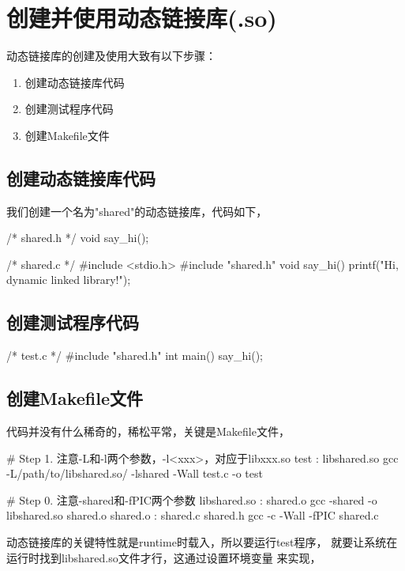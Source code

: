 ﻿\section[Shared library(.so)]{创建并使用动态链接库(.so)}
动态链接库的创建及使用大致有以下步骤：
\begin{enumerate}
  \item 创建动态链接库代码
  \item 创建测试程序代码
  \item 创建Makefile文件
\end{enumerate}

\subsection[code for .so file]{创建动态链接库代码}
我们创建一个名为"shared"的动态链接库，代码如下，

\begin{cppcode}
/* shared.h */
void say_hi();

/* shared.c */
#include <stdio.h>
#include "shared.h"
void say_hi() {
  printf("Hi, dynamic linked library!\n");
}
\end{cppcode}

\subsection[code for test program]{创建测试程序代码}
\begin{cppcode}
/* test.c */
#include "shared.h"
int main()
{
  say_hi();
}
\end{cppcode}

\subsection[create Makefile]{创建Makefile文件}
代码并没有什么稀奇的，稀松平常，关键是Makefile文件，

\begin{makecode}
# Step 1. 注意-L和-l两个参数，-l<xxx>，对应于libxxx.so
test : libshared.so
  gcc -L/path/to/libshared.so/ -lshared -Wall test.c -o test

# Step 0. 注意-shared和-fPIC两个参数
libshared.so : shared.o
  gcc -shared -o libshared.so shared.o
shared.o : shared.c shared.h
  gcc -c -Wall -fPIC shared.c
\end{makecode}

动态链接库的关键特性就是runtime时载入，所以要运行test程序，
就要让系统在运行时找到libshared.so文件才行，这通过设置环境变量
来实现，

